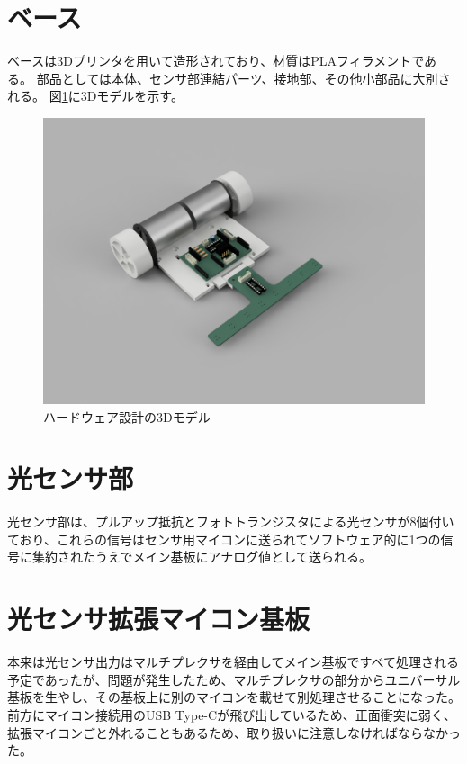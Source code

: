 \documentclass{ltjsreport}
\begin{document}
\section{ベース}
ベースは3Dプリンタを用いて造形されており、材質はPLAフィラメントである。
部品としては本体、センサ部連結パーツ、接地部、その他小部品に大別される。
図\ref{fig:3dmodel}に3Dモデルを示す。

\begin{figure}[tbh]
  \centering
  \includegraphics[keepaspectratio, scale=0.4]
       {img/figure_carFramev3_angle.png}
  \caption{ハードウェア設計の3Dモデル}
  \label{fig:3dmodel}
 \end{figure}


\section{光センサ部}
光センサ部は、プルアップ抵抗とフォトトランジスタによる光センサが8個付いており、これらの信号はセンサ用マイコンに送られてソフトウェア的に1つの信号に集約されたうえでメイン基板にアナログ値として送られる。


\section{光センサ拡張マイコン基板}
本来は光センサ出力はマルチプレクサを経由してメイン基板ですべて処理される予定であったが、問題が発生したため、マルチプレクサの部分からユニバーサル基板を生やし、その基板上に別のマイコンを載せて別処理させることになった。
前方にマイコン接続用のUSB Type-Cが飛び出しているため、正面衝突に弱く、拡張マイコンごと外れることもあるため、取り扱いに注意しなければならなかった。
\end{document}
